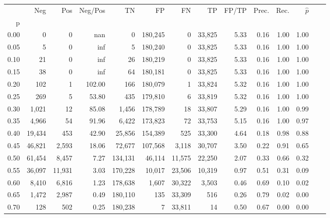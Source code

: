 \begin{tabular}{rrrrrrrrrrrrrr}
\toprule
{} &     Neg &     Pos & Neg/Pos &       TN &       FP &      FN &      TP & FP/TP & Prec. &  Rec. & $\hat{p}$ \\
p    &         &         &         &          &          &         &         &       &       &       &           \\
\midrule
0.00 &       0 &       0 &     nan &        0 &  180,245 &       0 &  33,825 &  5.33 &  0.16 &  1.00 &      1.00 \\
0.05 &       5 &       0 &     inf &        5 &  180,240 &       0 &  33,825 &  5.33 &  0.16 &  1.00 &      1.00 \\
0.10 &      21 &       0 &     inf &       26 &  180,219 &       0 &  33,825 &  5.33 &  0.16 &  1.00 &      1.00 \\
0.15 &      38 &       0 &     inf &       64 &  180,181 &       0 &  33,825 &  5.33 &  0.16 &  1.00 &      1.00 \\
0.20 &     102 &       1 &  102.00 &      166 &  180,079 &       1 &  33,824 &  5.32 &  0.16 &  1.00 &      1.00 \\
0.25 &     269 &       5 &   53.80 &      435 &  179,810 &       6 &  33,819 &  5.32 &  0.16 &  1.00 &      1.00 \\
0.30 &   1,021 &      12 &   85.08 &    1,456 &  178,789 &      18 &  33,807 &  5.29 &  0.16 &  1.00 &      0.99 \\
0.35 &   4,966 &      54 &   91.96 &    6,422 &  173,823 &      72 &  33,753 &  5.15 &  0.16 &  1.00 &      0.97 \\
0.40 &  19,434 &     453 &   42.90 &   25,856 &  154,389 &     525 &  33,300 &  4.64 &  0.18 &  0.98 &      0.88 \\
0.45 &  46,821 &   2,593 &   18.06 &   72,677 &  107,568 &   3,118 &  30,707 &  3.50 &  0.22 &  0.91 &      0.65 \\
0.50 &  61,454 &   8,457 &    7.27 &  134,131 &   46,114 &  11,575 &  22,250 &  2.07 &  0.33 &  0.66 &      0.32 \\
0.55 &  36,097 &  11,931 &    3.03 &  170,228 &   10,017 &  23,506 &  10,319 &  0.97 &  0.51 &  0.31 &      0.09 \\
0.60 &   8,410 &   6,816 &    1.23 &  178,638 &    1,607 &  30,322 &   3,503 &  0.46 &  0.69 &  0.10 &      0.02 \\
0.65 &   1,472 &   2,987 &    0.49 &  180,110 &      135 &  33,309 &     516 &  0.26 &  0.79 &  0.02 &      0.00 \\
0.70 &     128 &     502 &    0.25 &  180,238 &        7 &  33,811 &      14 &  0.50 &  0.67 &  0.00 &      0.00 \\

\end{tabular}
